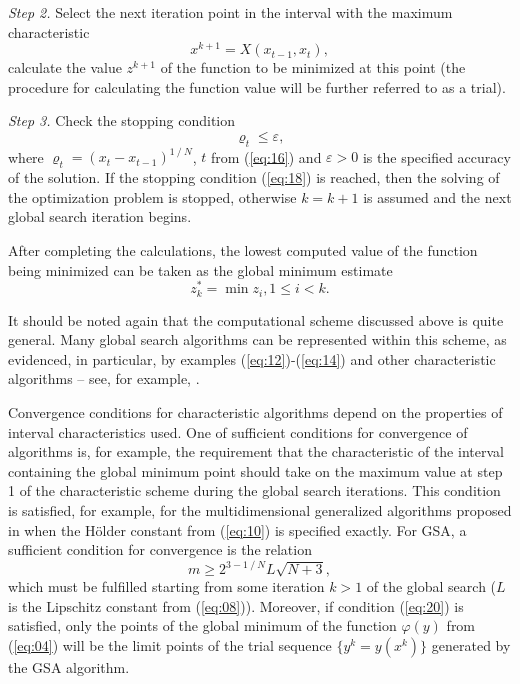 \documentclass[runningheads]{llncs}
\begin{document}
\textit{Step 2.} Select the next iteration point in the interval with the maximum characteristic
\begin{equation}
\label{eq:17}
x^{k+1}=X(x_{t-1}, x_t),
\end{equation}
calculate the value $z^{k+1}$ of the function to be minimized at this point (the procedure for calculating the function value will be further referred to as a trial).

\textit{Step 3.} Check the stopping condition
\begin{equation}
\label{eq:18}
\varrho_t \leq \varepsilon,
\end{equation}
where $\varrho_t = (x_t-x_{t-1})^{1⁄N}$, $t$ from (\ref{eq:16}) and $\varepsilon > 0$ is the specified accuracy of the solution. If the stopping condition (\ref{eq:18}) is reached, then the solving of the optimization problem is stopped, otherwise $k=k+1$ is assumed and the next global search iteration begins.

After completing the calculations, the lowest computed value of the function being minimized can be taken as the global minimum estimate
\begin{equation}
\label{eq:19}
z_k^* = \min z_i, 1 \leq i<k.
\end{equation}

It should be noted again that the computational scheme discussed above is quite general. Many global search algorithms can be represented within this scheme, as evidenced, in particular, by examples (\ref{eq:12})-(\ref{eq:14}) and other characteristic algorithms -- see, for example, \cite{c28,c29,c30,c31,c32,c33,c34,c35,c36,c37}. 

Convergence conditions for characteristic algorithms depend on the properties of interval characteristics used. One of sufficient conditions for convergence of algorithms is, for example, the requirement that the characteristic of the interval containing the global minimum point should take on the maximum value at step 1 of the characteristic scheme during the global search iterations. This condition is satisfied, for example, for the multidimensional generalized algorithms proposed in \cite{c22,c23} when the H{\"o}lder constant from (\ref{eq:10}) is specified exactly. For GSA, a sufficient condition for convergence is the relation \cite{c15}
\begin{equation}
\label{eq:20}
m \geq 2^{3-1⁄N} L\sqrt{N+3},
\end{equation}
which must be fulfilled starting from some iteration $k>1$ of the global search ($L$ is the Lipschitz constant from (\ref{eq:08})). Moreover, if condition (\ref{eq:20}) is satisfied, only the points of the global minimum of the function $\varphi(y)$ from (\ref{eq:04}) will be the limit points of the trial sequence $\{y^k=y(x^k)\}$ generated by the GSA algorithm.
\end{document}

